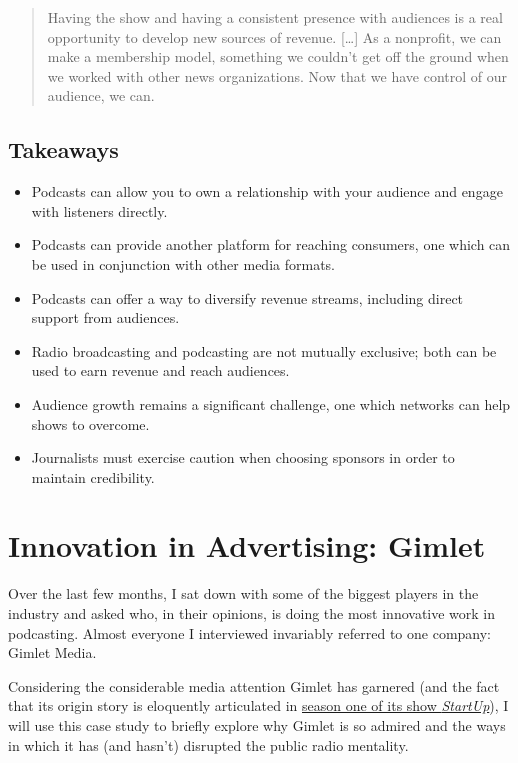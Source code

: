 \documentclass[notoc, symmetric, nobib, nols]{towcenter-guideto-book}
\begin{document}
\begin{quote}
Having the show and having a consistent presence with audiences is a real opportunity to develop new sources of revenue. […] As a nonprofit, we can make a membership model, something we couldn't get off the ground when we worked with other news organizations. Now that we have control of our audience, we can.\autocite{reveal} 
\end{quote}

\subsection{Takeaways}
 
\begin{itemize} 
\item Podcasts can allow you to own a relationship with your audience and engage with listeners directly.
\item Podcasts can provide another platform for reaching consumers, one which can be used in conjunction with other media formats.
\item Podcasts can offer a way to diversify revenue streams, including direct support from audiences. 
\item Radio broadcasting and podcasting are not mutually exclusive; both can be used to earn revenue and reach audiences.
\item Audience growth remains a significant challenge, one which networks can help shows to overcome.
\item Journalists must exercise caution when choosing sponsors in order to maintain credibility.
\end{itemize}

\section{Innovation in Advertising: Gimlet}

Over the last few months, I sat down with some of the biggest players in the industry and asked who, in their opinions, is doing the most innovative work in podcasting. Almost everyone I interviewed invariably referred to one company: Gimlet Media. 

Considering the considerable media attention Gimlet has garnered (and the fact that its origin story is eloquently articulated in \href{https://gimletmedia.com/show/startup/episodes/season/season-1/page/2/}{season one of its show \textit{StartUp}}), I will use this case study to briefly explore why Gimlet is so admired and the ways in which it has (and hasn't) disrupted the public radio mentality. 
\end{document}
